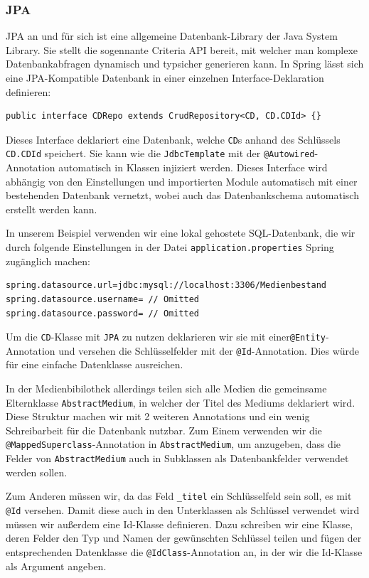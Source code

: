\documentclass{article}
\begin{document}
\subsubsection{JPA}

JPA an und für sich ist eine allgemeine Datenbank-Library der Java System Library.
Sie stellt die sogennante Criteria API bereit, mit welcher man komplexe Datenbankabfragen dynamisch und typsicher generieren kann.
In Spring lässt sich eine JPA-Kompatible Datenbank in einer einzelnen Interface-Deklaration definieren:

\begin{lstlisting}
public interface CDRepo extends CrudRepository<CD, CD.CDId> {}
\end{lstlisting}

Dieses Interface deklariert eine Datenbank, welche \texttt{CD}s anhand des Schlüssels \texttt{CD.CDId} speichert.
Sie kann wie die \texttt{JdbcTemplate} mit der \texttt{@Autowired}-Annotation automatisch in Klassen injiziert werden.
Dieses Interface wird abhängig von den Einstellungen und importierten Module automatisch mit einer bestehenden Datenbank vernetzt, wobei auch das Datenbankschema automatisch erstellt werden kann.

In unserem Beispiel verwenden wir eine lokal gehostete SQL-Datenbank, die wir durch folgende Einstellungen in der Datei \texttt{application.properties} Spring zugänglich machen:

\begin{lstlisting}
spring.datasource.url=jdbc:mysql://localhost:3306/Medienbestand 
spring.datasource.username= // Omitted
spring.datasource.password= // Omitted
\end{lstlisting}

Um die \texttt{CD}-Klasse mit \texttt{JPA} zu nutzen deklarieren wir sie mit einer\texttt{@Entity}-Annotation und versehen die Schlüsselfelder mit der \texttt{@Id}-Annotation.
Dies würde für eine einfache Datenklasse ausreichen.

In der Medienbibilothek allerdings teilen sich alle Medien die gemeinsame Elternklasse \texttt{AbstractMedium}, in welcher der Titel des Mediums deklariert wird.
Diese Struktur machen wir mit 2 weiteren Annotations und ein wenig Schreibarbeit für die Datenbank nutzbar.
Zum Einem verwenden wir die \texttt{@MappedSuperclass}-Annotation in \texttt{AbstractMedium}, um anzugeben, dass die Felder von \texttt{AbstractMedium} auch in Subklassen als Datenbankfelder verwendet werden sollen.

Zum Anderen müssen wir, da das Feld \texttt{\_titel} ein Schlüsselfeld sein soll, es mit \texttt{@Id} versehen.
Damit diese auch in den Unterklassen als Schlüssel verwendet wird müssen wir außerdem eine Id-Klasse definieren.
Dazu schreiben wir eine Klasse, deren Felder den Typ und Namen der gewünschten Schlüssel teilen und fügen der entsprechenden Datenklasse die \texttt{@IdClass}-Annotation an, in der wir die Id-Klasse als Argument angeben.
\end{document}

